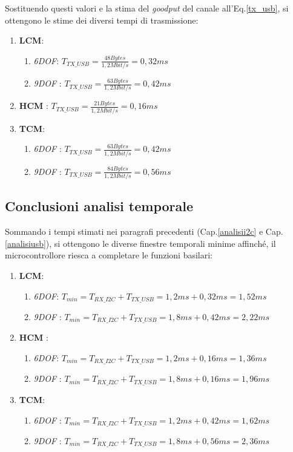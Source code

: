 Sostituendo questi valori e la stima del \textit{goodput} del canale all'Eq.\ref{tx_usb}, si ottengono le stime dei diversi tempi di trasmissione:

\begin{enumerate}
	\item \textbf{LCM}:
	\begin{enumerate}
		\item \textit{6DOF}: $ T_{TX\_USB}=  \frac{48 Bytes}{1,2 Mbit/s} = 0,32 ms $
		\item \textit{9DOF} : $ T_{TX\_USB}=  \frac{63 Bytes}{1,2 Mbit/s} = 0,42 ms $
	\end{enumerate}
	\item \textbf{HCM} : $ T_{TX\_USB}=  \frac{21 Bytes}{1,2 Mbit/s} = 0,16 ms $
	
	\item \textbf{TCM}:
	\begin{enumerate}
		\item \textit{6DOF} : $ T_{TX\_USB}=  \frac{63 Bytes}{1,2 Mbit/s} = 0,42 ms $
		\item \textit{9DOF} : $ T_{TX\_USB}=  \frac{84 Bytes}{1,2 Mbit/s} = 0,56 ms $
	\end{enumerate}
\end{enumerate}



\subsection{Conclusioni analisi temporale}
Sommando i tempi stimati nei paragrafi precedenti (Cap.\ref{analisii2c} e Cap.\ref{analisiusb}), si ottengono le diverse finestre temporali minime affinché, il microcontrollore riesca a completare le funzioni basilari:

\begin{enumerate}
	\item \textbf{LCM}:
	\begin{enumerate}
		\item \textit{6DOF}: $T_{min} = T_{RX\_I2C} + T_{TX\_USB} = 1,2 ms + 0,32 ms = 1,52 ms $
		\item \textit{9DOF} : $ T_{min} = T_{RX\_I2C} + T_{TX\_USB} = 1,8 ms + 0,42 ms = 2,22 ms $
	\end{enumerate}
	\item \textbf{HCM} :
		\begin{enumerate}
		\item \textit{6DOF}: $T_{min} = T_{RX\_I2C} + T_{TX\_USB} = 1,2 ms + 0,16 ms = 1,36 ms $
		\item \textit{9DOF} : $ T_{min} = T_{RX\_I2C} + T_{TX\_USB} = 1,8 ms + 0,16 ms = 1,96 ms $
	\end{enumerate}
	\item \textbf{TCM}:
	\begin{enumerate}
		\item \textit{6DOF} : $ T_{min} = T_{RX\_I2C} + T_{TX\_USB} = 1,2 ms + 0,42 ms = 1,62 ms $
		\item \textit{9DOF} : $T_{min} = T_{RX\_I2C} + T_{TX\_USB} = 1,8 ms + 0,56 ms = 2,36 ms $
	\end{enumerate}
\end{enumerate}

